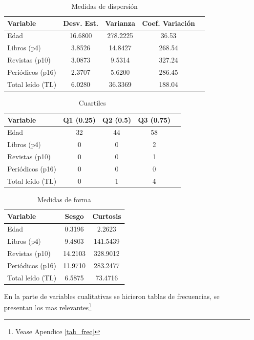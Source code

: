 \documentclass[aps,reprint]{revtex4-2}
\begin{document}
\begin{table}[H]
\centering
\caption{Medidas de dispersión}
\begin{tabular}{lcccc}
\toprule
\textbf{Variable} & \textbf{Desv. Est.} & \textbf{Varianza} & \textbf{Coef. Variación} \\
\midrule
Edad & 16.6800 & 278.2225 & 36.53 \\
Libros (p4) & 3.8526 & 14.8427 & 268.54 \\
Revistas (p10) & 3.0873 & 9.5314 & 327.24 \\
Periódicos (p16) & 2.3707 & 5.6200 & 286.45 \\
Total leído (TL) & 6.0280 & 36.3369 & 188.04 \\
\bottomrule
\end{tabular}
\end{table}

\begin{table}[H]
\centering
\caption{Cuartiles}
\begin{tabular}{lcccc}
\toprule
\textbf{Variable} & \textbf{Q1 (0.25)} & \textbf{Q2 (0.5)} & \textbf{Q3 (0.75)} \\
\midrule
Edad & 32 & 44 & 58 \\
Libros (p4) & 0 & 0 & 2 \\
Revistas (p10) & 0 & 0 & 1 \\
Periódicos (p16) & 0 & 0 & 0 \\
Total leído (TL) & 0 & 1 & 4 \\
\bottomrule
\end{tabular}
\end{table}

\begin{table}[H]
\centering
\caption{Medidas de forma}
\begin{tabular}{lcc}
\toprule
\textbf{Variable} & \textbf{Sesgo} & \textbf{Curtosis} \\
\midrule
Edad & 0.3196 & 2.2623 \\
Libros (p4) & 9.4803 & 141.5439 \\
Revistas (p10) & 14.2103 & 328.9012 \\
Periódicos (p16) & 11.9710 & 283.2477 \\
Total leído (TL) & 6.5875 & 73.4716 \\
\bottomrule
\end{tabular}
\end{table}

En la parte de variables cualitativas se hicieron tablas de frecuencias, se presentan los mas relevantes\footnote{Vease Apendice \ref{tab_frec}}
\end{document}
